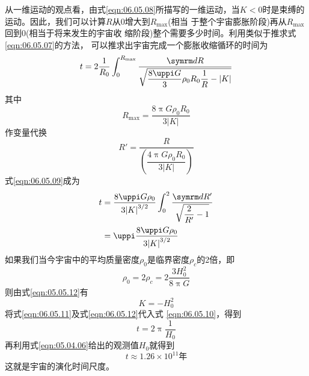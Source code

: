 从一维运动的观点看，由式\eqref{eqn:06.05.08}所描写的一维运动，当$ K
  <0 $时是束缚的运动。因此，我们可以计算$ R $从0增大到$ R_{\max} $(相当
于整个宇宙膨胀阶段)再从$ R_{\max} $回到0(相当于将来发生的宇宙收
缩阶段)整个需要多少时间。利用类似于推求式\eqref{eqn:06.05.07}的方法，
可以推求出宇宙完成一个膨胀收缩循环的时间为
\begin{equation}\label{eqn:06.05.09}
  t = 2 \frac { 1 } { R _ { 0 } } \int _ 0 ^ { R _ { \max } } \frac { \dif R } { \sqrt { \dfrac { 8 \uppi G } { 3 } \rho _ { 0 } R _ { 0 } \dfrac { 1 } { R } - | K | } }
\end{equation}
其中
\begin{equation*}
  R _ { \max } = \frac { 8 \uppi G \rho _ { 0 } R _ { 0 } } { 3 | K | }
\end{equation*}
作变量代换
\begin{equation*}
  R ' = \frac { R } { \left( \dfrac { 4 \uppi G \rho _ { 0 } R _ { 0 } } { 3 | K | } \right) }
\end{equation*}
式\eqref{eqn:06.05.09}成为
\begin{equation}\label{eqn:06.05.10}
  \begin{aligned}
    t & = \frac { 8 \uppi G \rho _ { 0 } } { 3 { | K | } ^ { 3 / 2 } } \int _ { 0 } ^ { 2 } \frac { \dif R '  } { \sqrt { \dfrac { 2 } { R ' } - 1 } } \\
      & = \uppi \frac { 8 \uppi G \rho _ { 0 } } { 3 { | K | } ^ { 3 / 2 } }
  \end{aligned}
\end{equation}
如果我们当今宇宙中的平均质量密度$ \rho _ 0 $是临界密度$ \rho _ c $的2倍，即
\begin{equation}\label{eqn:06.05.11}
  \rho _ { 0 } = 2 \rho _ { c } = 2 \frac { 3 H _ 0 ^ { 2 } } { 8 \uppi G }
\end{equation}
则由式\eqref{eqn:05.05.12}有
\begin{equation}\label{eqn:06.05.12}
  K = - H _ { 0 } ^ { 2 }
\end{equation}
将式\eqref{eqn:06.05.11}及式\eqref{eqn:06.05.12}代入式 \eqref{eqn:06.05.10}，得到
\begin{equation}\label{eqn:06.05.13}
  t = 2 \uppi \frac { 1 } { H _ { 0 } }
\end{equation}
再利用式\eqref{eqn:05.04.06}给出的观测值$ H _ { 0 } $就得到
\begin{equation*}
  t \approx 1.26 \times 10 ^ { 11 } \text{年}
\end{equation*}
这就是宇宙的演化时间尺度。